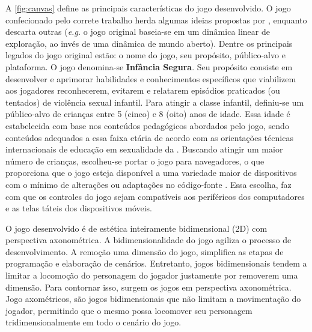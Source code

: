 A \autoref{fig:canvas} define as principais características do jogo desenvolvido. O jogo confecionado pelo correte trabalho herda algumas ideias propostas por , enquanto descarta outras (\textit{e.g.} o jogo original baseia-se em um dinâmica linear de exploração, ao invés de uma dinâmica de mundo aberto). Dentre os principais legados do jogo original estão: o nome do jogo, seu propósito, público-alvo e plataforma. O jogo denomina-se \textbf{Infância Segura}. Seu propósito consiste em desenvolver e aprimorar habilidades e conhecimentos específicos que viabilizem aos jogadores reconhecerem, evitarem e relatarem episódios praticados (ou tentados) de violência sexual infantil. Para atingir a classe infantil, definiu-se um público-alvo de crianças entre 5 (cinco) e 8 (oito) anos de idade. Essa idade é estabelecida com base nos conteúdos pedagógicos abordados pelo jogo, sendo conteúdos adequados a essa faixa etária de acordo com as orientações técnicas internacionais de educação em sexualidade da . Buscando atingir um maior número de crianças, escolheu-se portar o jogo para navegadores, o que proporciona que o jogo esteja disponível a uma variedade maior de dispositivos com o mínimo de alterações ou adaptações no código-fonte \cite{carrara2018criancca}. Essa escolha, faz com que os controles do jogo sejam compatíveis aos periféricos dos computadores e as telas táteis dos dispositivos móveis.

O jogo desenvolvido é de estética inteiramente bidimensional (2D) com perspectiva axonométrica. A bidimensionalidade do jogo agiliza o processo de desenvolvimento. A remoção uma dimensão do jogo, simplifica as etapas de programação e elaboração de cenários. Entretanto, jogos bidimensionais tendem a limitar a locomoção do personagem do jogador justamente por removerem uma dimensão. Para contornar isso, surgem os jogos em perspectiva axonométrica. Jogo axométricos, são jogos bidimensionais que não limitam a movimentação do jogador, permitindo que o mesmo possa locomover seu personagem tridimensionalmente em todo o cenário do jogo. 

